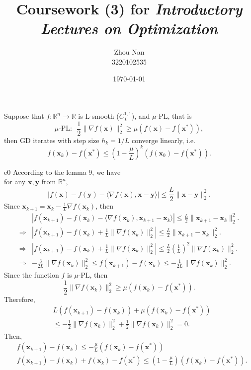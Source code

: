 \documentclass{article}
\title{Coursework (3) for \emph{Introductory Lectures on Optimization}}
\author{Zhou Nan \\ 3220102535}
\date{\today}
\newcommand{\xB}{\bm{x}}
\newcommand{\yB}{\bm{y}}
\newcommand{\RBB}{\mathbb{R}}
\begin{document}
\maketitle

\begin{excercise}\label{e0}
	Suppose that $f : \mathbb{R}^n \rightarrow \mathbb{R}$ is L-smooth ($C_L^{1,1}$), and  $\mu$-PL, that is 
	\[
	\textrm{$\mu$-PL:~~}\frac{1}{2} \| \nabla f(\xB) \|_2^2 \geq \mu \left( f(\xB) - f(\xB^*) \right),
	\]
	then GD iterates with step size $h_k = 1/L $ converge linearly, i.e.
	\[
	f(\xB_k) - f(\xB^*) \leq \left( 1 - \frac{\mu}{L} \right)^k \left(  f(\xB_0) - f(\xB^*)\right).
	\]
\end{excercise}

\begin{PROOF}{e0}
	According to the lemma 9, we have \\
	for any $\xB, \yB$ from $\RBB^n$,
	\[
	|f(\xB) - f(\yB) - \langle \nabla f(\xB), \xB - \yB \rangle | \leq \frac{L}{2} \| \xB - \yB \|_2^2.
	\]
	Since $\xB_{k+1} = \xB_k - \frac{1}{L} \nabla f(\xB_k)$, then 
	\[
	\begin{aligned}
	&|f(\xB_{k+1}) - f(\xB_k) - \langle \nabla f(\xB_k), \xB_{k+1} - \xB_k \rangle | 
	\leq \frac{L}{2} \| \xB_{k+1} - \xB_k \|_2^2.\\
	\Rightarrow &|f(\xB_{k+1}) - f(\xB_k) + \frac{1}{L} \| \nabla f(\xB_k) \|_2^2 | 
	\leq \frac{L}{2} \| \xB_{k+1} - \xB_k \|_2^2.\\
	\Rightarrow &|f(\xB_{k+1}) - f(\xB_k) + \frac{1}{L} \| \nabla f(\xB_k) \|_2^2 |
	\leq \frac{L}{2} \left( \frac{1}{L} \right)^2 \| \nabla f(\xB_k) \|_2^2.\\
	\Rightarrow &-\frac{3}{2L} \| \nabla f(\xB_k) \|_2^2 \leq f(\xB_{k+1}) - f(\xB_k) \leq -\frac{1}{2L} \| \nabla f(\xB_k) \|_2^2.
	\end{aligned}
	\]
	Since the function $f$ is $\mu$-PL, then 
	\[
	\frac{1}{2} \| \nabla f(\xB_k) \|_2^2 \geq \mu \left( f(\xB_k) - f(\xB^*) \right).
	\]
	Therefore,
	\[
	\begin{aligned}
	&L(f(\xB_{k+1}) - f(\xB_k)) + \mu (f(\xB_k) - f(\xB^*)) \\
	&\leq -\frac{1}{2} \| \nabla f(\xB_k) \|_2^2 + \frac{1}{2} \| \nabla f(\xB_k) \|_2^2 = 0.
	\end{aligned}
	\]
	Then,
	\[
	\begin{aligned}
	&f(\xB_{k+1}) - f(\xB_k) \leq -\frac{\mu}{L} (f(\xB_k) - f(\xB^*)) \\
	&f(\xB_{k+1}) - f(\xB_k) + f(\xB_k) - f(\xB^*) \leq (1 - \frac{\mu}{L}) (f(\xB_k) - f(\xB^*)).\\

\end{aligned}\]
\end{PROOF}
\end{document}
